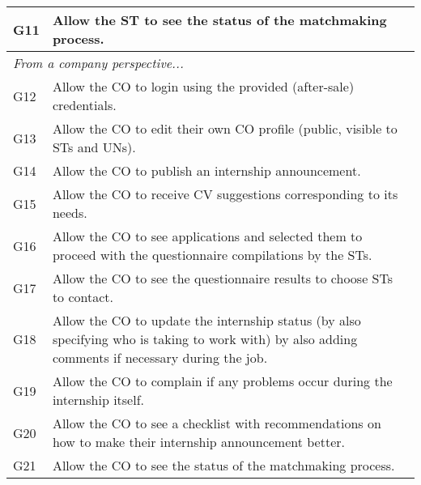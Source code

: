 \begin{longtable}{|l|p{}|}
    \hline
    G11           & Allow the ST to see the status of the matchmaking process.                                                                                        \\
    \hline \hline
    \multicolumn{2}{|l|}{\textit{From a company perspective...}}                                                                                                      \\
    \hline
    G12           & Allow the CO to login using the provided (after-sale) credentials.                                                                                \\
    \hline
    G13           & Allow the CO to edit their own CO profile (public, visible to STs and UNs).                                                                       \\
    \hline
    G14           & Allow the CO to publish an internship announcement.                                                                                               \\
    \hline
    G15           & Allow the CO to receive CV suggestions corresponding to its needs.                                                                                \\
    \hline
    G16           & Allow the CO to see applications and selected them to proceed with the questionnaire compilations by the STs.                                     \\
    \hline
    G17           & Allow the CO to see the questionnaire results to choose STs to contact.                                                                           \\
    \hline
    G18           & Allow the CO to update the internship status (by also specifying who is taking to work with) by also adding comments if necessary during the job. \\
    \hline
    G19           & Allow the CO to complain if any problems occur during the internship itself.                                                                      \\
    \hline
    G20           & Allow the CO to see a checklist with recommendations on how to make their internship announcement better.                                         \\
    \hline
    G21           & Allow the CO to see the status of the matchmaking process.                                                                                        \\

\end{longtable}
